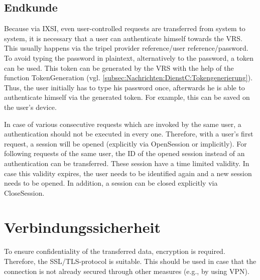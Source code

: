 \subsection*{Endkunde}
Because via IXSI, even user-controlled requests are transferred from system to system, it is necessary that a user can authenticate himself towards the VRS.
This usually happens via the tripel provider reference/user reference/password. To avoid typing the password in plaintext, alternatively to the password, a token can be used. This token can be generated by the VRS with the help of the function  TokenGeneration (vgl. \cref{subsec:Nachrichten:DienstC:Tokengenerierung}).
Thus, the user initially has to type his password once, afterwards he is able to authenticate himself via the generated token. For example, this can be saved on the user's device. 

In case of various consecutive requests which are invoked by the same user, a authentication should not be executed in every one. Therefore, with a user's first request, a session will be opened (explicitly via OpenSession or implicitly). For following requests of the same user, the ID of the opened session instead of an authentication can be transferred. These session have a time limited validity. In case this validity expires, the user needs to be identified again and a new session needs to be opened. In addition, a session can be closed explicitly via CloseSession.

\section{Verbindungssicherheit}
To ensure confidentiality of the transferred data, encryption is required. Therefore, the SSL/TLS-protocol is suitable. This should be used in case that the connection is not already secured through other measures (e.g., by using VPN).
